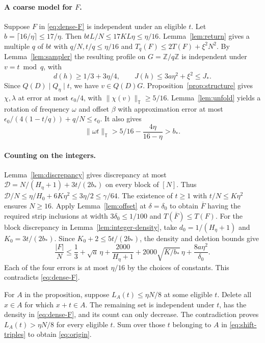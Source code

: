 \documentclass[11pt,reqno]{amsart}
\newcommand{\Z}{\mathbb Z}
\newcommand{\T}{\mathbb T}
\numberwithin{equation}{section}
\begin{document}
\paragraph{A coarse model for \(F\).}
Suppose \(F\) in \eqref{eq:dense-F} is independent under an
eligible \(t\). Let \(b=\lceil16/\eta\rceil\le17/\eta\).
Then \(btL/N\le17KL\eta\le\eta/16\).
Lemma~\ref{lem:return} gives a multiple \(q\) of \(bt\) with
\(q/N,t/q\le\eta/16\) and \(T_q(F)\le2T(F)+\xi^2N^2\).
By Lemma~\ref{lem:sampler} the resulting profile on \(G=\Z/q\Z\)
is independent under \(v=t\bmod q\), with
\[
 d(h)\ge1/3+3\eta/4,\qquad J(h)\le3a\eta^2+\xi^2\le J_*.
\]
Since \(Q(D)\mid Q_\eta\mid t\), we have \(v\in Q(D)G\).
Proposition~\ref{prop:structure} gives \(\chi,\lambda\) at
error at most \(\epsilon_0/4\), with \(\|\chi(v)\|_\T\ge5/16\).
Lemma~\ref{lem:unfold} yields a rotation of frequency \(\omega\)
and offset \(\beta\) with approximation error at most
\(\epsilon_0/(4(1-t/q))+q/N\le\epsilon_0\). It also gives
\[
 \|\omega t\|_\T>5/16-\frac{4\eta}{16-\eta}>b_* .
\]

\paragraph{Counting on the integers.}
Lemma~\ref{lem:discrepancy} gives discrepancy at most
\(\mathcal D=N/(H_\eta+1)+3t/(2b_*)\) on every block of \([N]\).
Thus \(\mathcal D/N\le\eta/H_0+6K\eta^2\le3\eta/2\le\gamma/64\).
The existence of \(t\ge1\) with \(t/N\le K\eta^2\) ensures \(N\ge16\).
Apply Lemma~\ref{lem:offset} at \(\delta=\delta_0\) to obtain
\(\overline F\) having the required strip inclusions at width
\(3\delta_0\le1/100\) and \(T(\overline F)\le T(F)\).
For the block discrepancy in Lemma~\ref{lem:integer-density},
take \(d_0=1/(H_\eta+1)\) and \(K_0=3t/(2b_*)\).
Since \(K_0+2\le5t/(2b_*)\), the density and deletion bounds give
\[
 \frac{|F|}{N}\le\frac13+\sqrt a\,\eta
        +\frac{2000}{H_\eta+1}
        +2000\sqrt{K/b_*}\,\eta
        +\frac{8a\eta^2}{\delta_0}.
\]
Each of the four errors is at most \(\eta/16\) by the choices
of constants. This contradicts \eqref{eq:dense-F}.

For \(A\) in the proposition, suppose \(L_A(t)\le\eta N/8\)
at some eligible \(t\). Delete all \(x\in A\) for which
\(x+t\in A\). The remaining set is independent under \(t\),
has the density in \eqref{eq:dense-F}, and its count can only
decrease. The contradiction proves \(L_A(t)>\eta N/8\) for
every eligible \(t\). Sum over those \(t\) belonging to \(A\)
in \eqref{eq:shift-triples} to obtain \eqref{eq:origin}.
\end{document}
